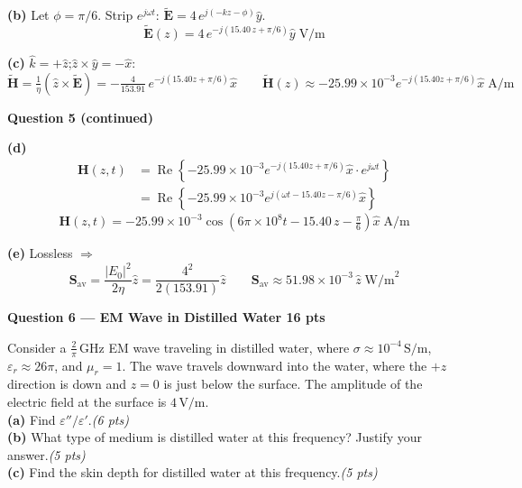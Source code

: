 \documentclass[11pt,letterpaper]{article}
\begin{document}
\textbf{(b)} Let $\phi=\pi/6$. Strip $e^{j\omega t}$: $\tilde{\mathbf{E}}=4\,e^{j(-kz-\phi)}\hat{y}$.
\[\boxed{\tilde{\mathbf{E}}(z)=4\,e^{-j(15.40\,z+\pi/6)}\hat{y}\;\text{V/m}}\]

\textbf{(c)} $\hat{k}=+\hat{z}$;\quad $\hat{z}\times\hat{y}=-\hat{x}$:
\[\tilde{\mathbf{H}}=\tfrac{1}{\eta}(\hat{z}\times\tilde{\mathbf{E}})
=-\tfrac{4}{153.91}\,e^{-j(15.40z+\pi/6)}\hat{x}
\qquad\boxed{\tilde{\mathbf{H}}(z)\approx-25.99\times10^{-3}e^{-j(15.40z+\pi/6)}\hat{x}\;\text{A/m}}\]

\newpage

\colorbox{purplebg}{\parbox{\dimexpr\linewidth-2\fboxsep}{\color{purple}\large\textbf{Question 5 (continued)}}}

\vspace{6pt}
\textbf{(d)}
\begin{align*}
\mathbf{H}(z,t)&=\operatorname{Re}\!\left\{-25.99\times10^{-3}e^{-j(15.40z+\pi/6)}\hat{x}\cdot e^{j\omega t}\right\}\\
&=\operatorname{Re}\!\left\{-25.99\times10^{-3}e^{j(\omega t-15.40z-\pi/6)}\hat{x}\right\}
\end{align*}
\[\boxed{\mathbf{H}(z,t)=-25.99\times10^{-3}\cos\!\left(6\pi\times10^8 t-15.40\,z-\tfrac{\pi}{6}\right)\hat{x}\;\text{A/m}}\]

\textbf{(e)} Lossless $\Rightarrow$
\[\mathbf{S}_\text{av}=\frac{|E_0|^2}{2\eta}\hat{z}=\frac{4^2}{2(153.91)}\hat{z}
\qquad\boxed{\mathbf{S}_\text{av}\approx51.98\times10^{-3}\,\hat{z}\;\text{W/m}^2}\]

\newpage
\colorbox{coralbg}{\parbox{\dimexpr\linewidth-2\fboxsep}{\color{coral}\large\textbf{Question 6 --- EM Wave in Distilled Water \hfill 16 pts}}}

\begin{qbox}
Consider a $\tfrac{2}{\pi}\,\text{GHz}$ EM wave traveling in distilled water, where $\sigma\approx10^{-4}\,\text{S/m}$, $\varepsilon_r\approx26\pi$, and $\mu_r=1$. The wave travels downward into the water, where the $+z$ direction is down and $z=0$ is just below the surface. The amplitude of the electric field at the surface is $4\,\text{V/m}$.\\[4pt]
\textbf{(a)} Find $\varepsilon''/\varepsilon'$.\hfill\textit{(6 pts)}\\[2pt]
\textbf{(b)} What type of medium is distilled water at this frequency? Justify your answer.\hfill\textit{(5 pts)}\\[2pt]
\textbf{(c)} Find the skin depth for distilled water at this frequency.\hfill\textit{(5 pts)}
\end{qbox}
\end{document}
